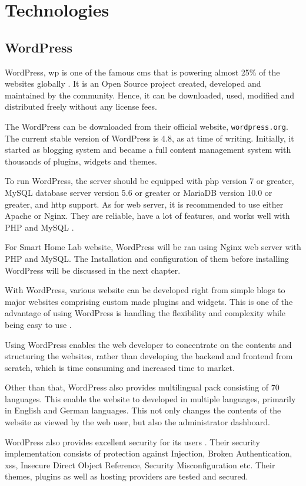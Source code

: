 \chapter{Technologies}
\section{WordPress}
WordPress, \ac{wp} is one of the famous \ac{cms} that is powering almost 25\% of the websites globally \cite{W3techs.2017}. It is an Open Source project created, developed and maintained by the community. Hence, it can be downloaded, used, modified and distributed freely without any license fees.

The WordPress can be downloaded from their official website, \texttt{wordpress.org}. The current stable version of WordPress is 4.8, as at time of writing. Initially, it started as blogging system and became a full content management system with thousands of plugins, widgets and themes.

To run WordPress, the server should be equipped with \ac{php} version 7 or greater, MySQL database server version 5.6 or greater or MariaDB version 10.0 or greater, and \ac{http} support. As for web server, it is recommended to use either Apache or Nginx. They are reliable, have a lot of features, and works well with PHP and MySQL \cite{WordPress.2017}.

For Smart Home Lab website, WordPress will be ran using Nginx web server with PHP and MySQL. The Installation and configuration of them before installing WordPress will be discussed in the next chapter.

With WordPress, various website can be developed right from simple blogs to major websites comprising custom made plugins and widgets. This is one of the advantage of using WordPress is handling the flexibility and complexity while being easy to use \cite{WhichCmsToChoose.2012}.

Using WordPress enables the web developer to concentrate on the contents and structuring the websites, rather than developing the backend and frontend from scratch, which is time consuming and increased time to market.

Other than that, WordPress also provides multilingual pack consisting of 70 languages. This enable the website to developed in multiple languages, primarily in English and German languages. This not only changes the contents of the website as viewed by the web user, but also the administrator dashboard.

WordPress also provides excellent security for its users \cite{WordPress.2017b}. Their security implementation consists of protection against Injection, Broken Authentication, \ac{xss}, Insecure Direct Object Reference, Security Misconfiguration etc. Their themes, plugins as well as hosting providers are tested and secured.

